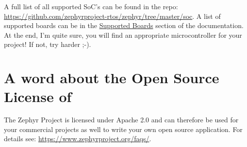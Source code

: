 A full list of all supported SoC's can be found in the repo: \url{https://github.com/zephyrproject-rtos/zephyr/tree/master/soc}.
A list of supported boards can be in the \href{https://docs.zephyrproject.org/latest/boards/index.html}{Supported Boards} section of the \Zephyr documentation. At the end, I'm quite sure, you will find an appropriate microcontroller for your project! If not, try harder ;-).


\section{A word about the Open Source License of \Zephyr}

The Zephyr Project is licensed under Apache 2.0 and can therefore be used for your commercial projects as well to write your own open source application. For details see: \url{https://www.zephyrproject.org/faqs/}.
